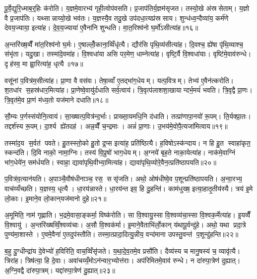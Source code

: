 पू॒र्वे॒द्युरि॒ध्माब॒र्॒हिः क॑रोति। य॒ज्ञमे॒वारभ्य॑ गृही॒त्वोप॑वसति। प्र॒जाप॑तिर्य॒ज्ञम॑सृजत। तस्यो॒खे अ॑स्रसेताम्। य॒ज्ञो वै प्र॒जाप॑तिः। यथ्सान्नाय्यो॒खे भव॑तः। य॒ज्ञस्यै॒व तदु॒खे उप॑दधा॒त्यप्र॑स्रसाय। शुन्ध॑ध्व॒न्दैव्या॑य॒ कर्म॑णे देवय॒ज्याया॒ इत्या॑ह। दे॒व॒य॒ज्याया॑ ए॒वैना॑नि शुन्धति। मा॒त॒रिश्व॑नो घ॒र्मो॑ऽसीत्या॑ह॥१६॥

अ॒न्तरि॑ख्ष॒व्वैँ मा॑त॒रिश्व॑नो घ॒र्मः। ए॒षाल्लोँ॒काना॒व्विँधृ॑त्यै। द्यौर॑सि पृथि॒व्य॑सीत्या॑ह। दि॒वश्च॒ ह्ये॑षा पृ॑थि॒व्याश्च॒ संभृ॑ता। यदु॒खा। तस्मा॑दे॒वमा॑ह। वि॒श्वधा॑या असि पर॒मेण॒ धाम्नेत्या॑ह। वृष्टि॒र्वै वि॒श्वधा॑याः। वृष्टि॑मे॒वाव॑रुन्धे। दृह॑स्व॒ मा ह्वा॒रित्या॑ह॒ धृत्यै॥१७॥

वसू॑नां प॒वित्र॑म॒सीत्या॑ह। प्रा॒णा वै वस॑वः। तेषा॒व्वाँ ए॒तद्भा॑ग॒धेयम्। यत्प॒वित्रम्। तेभ्य॑ ए॒वैन॑त्करोति। श॒तधा॑र स॒हस्र॑धार॒मित्या॑ह। प्रा॒णेष्वे॒वायु॑र्दधाति सर्व॒त्वाय॑। त्रि॒वृत्प॑लाशशा॒खायान्दर्भ॒मयं॑ भवति। त्रि॒वृद्वै प्रा॒णः। त्रि॒वृत॑मे॒व प्रा॒णं म॑ध्य॒तो यज॑माने दधाति॥१८॥

सौ॒म्यः प॒र्णस्स॑योनि॒त्वाय॑। सा॒ख्षात्प॒वित्र॑न्द॒र्भाः। प्राख्सा॒यमधि॒नि द॑धाति। तत्प्रा॑णापा॒नयो॑ रू॒पम्। ति॒र्यक्प्रा॒तः। तद्दर्श॑स्य रू॒पम्। दा॒र्श्य ह्ये॑तदह॑। अन्न॒व्वैँ च॒न्द्रमाः। अन्नं॑ प्रा॒णाः। उ॒भय॑मे॒वोपै॒त्यजा॑मित्वाय॥१९॥

तस्मा॑द॒य स॒र्वत॑ पवते। हु॒तस्स्तो॒को हु॒तो द्र॒प्स इत्या॑ह॒ प्रति॑ष्ठित्यै। ह॒विषोऽस्क॑न्दाय। न हि हु॒त स्वाहा॑कृत॒ स्कन्द॑ति। दि॒वि नाको॒ नामा॒ग्निः। तस्य॑ वि॒प्रुषो॑ भाग॒धेयम्। अ॒ग्नये॑ बृह॒ते नाका॒येत्या॑ह। नाक॑मे॒वाग्निं भा॑ग॒धेये॑न॒ सम॑र्धयति। स्वाहा॒ द्यावा॑पृथि॒वीभ्या॒मित्या॑ह। द्यावा॑पृथि॒व्योरे॒वैन॒त्प्रति॑ष्ठापयति॥२०॥

प॒वित्र॑व॒त्यान॑यति। अ॒पाञ्चै॒वौष॑धीनाञ्च॒ रस॒ ससृ॑जति। अथो॒ ओष॑धीष्वे॒व प॒शून्प्रति॑ष्ठापयति। अ॒न्वा॒रभ्य॒ वाच॑य्यँच्छति। य॒ज्ञस्य॒ धृत्यै। धा॒रय॑न्नास्ते। धा॒रय॑न्त इव॒ हि दु॒हन्ति॑। काम॑धुख्ष॒ इत्या॒हातृ॒तीय॑स्यै। त्रय॑ इ॒मे लो॒काः। इ॒माने॒व लो॒कान्‌यज॑मानो दुहे॥२१॥

अ॒मूमिति॒ नाम॑ गृह्णाति। भ॒द्रमे॒वासा॒ङ्कर्मा॒ विष्क॑रोति। सा वि॒श्वायु॒स्सा वि॒श्वव्य॑चा॒स्सा वि॒श्वक॒र्मेत्या॑ह। इ॒यव्वैँ वि॒श्वायु॑। अ॒न्तरि॑ख्षव्विँ॒श्वव्य॑चाः। अ॒सौ वि॒श्वक॑र्मा। इ॒माने॒वैताभि॑र्लो॒कान्‌ य॑थापू॒र्वन्दु॑हे। अथो॒ यथा प्रदा॒त्रे पुण्य॑मा॒शास्ते। ए॒वमे॒वैना॑ ए॒तदुप॑स्तौति। तस्मा॒त्प्रादा॒दित्यु॒न्नीय॒ वन्द॑माना उपस्तु॒वन्त॑ प॒शून्दु॑हन्ति॥२२॥

ब॒हु दु॒ग्धीन्द्रा॑य दे॒वेभ्यो॑ ह॒विरिति॒ वाच॒व्विँसृ॑जते। य॒था॒दे॒व॒तमे॒व प्रसौ॑ति। दैव्य॑स्य च मानु॒षस्य॑ च॒ व्यावृ॑त्यै। त्रिरा॑ह। त्रिष॑त्या॒ हि दे॒वाः। अवा॑चय्यँ॒मोऽन॑न्वार॒भ्योत्त॑राः। अप॑रिमितमे॒वाव॑ रुन्धे। न दा॑रुपा॒त्रेण॑ दुह्यात्। अ॒ग्नि॒वद्वै दा॑रुपा॒त्रम्। यद्दा॑रुपा॒त्रेण॑ दु॒ह्यात्॥२३॥

